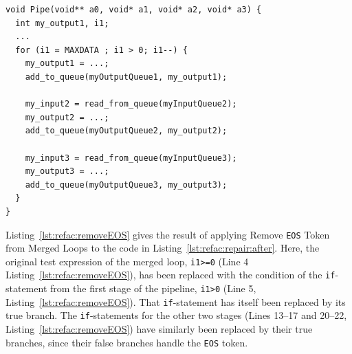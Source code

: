 \begin{lstlisting}[caption=Following application of Remove \lstinline{EOS}  Token from Merged Loops to Listing~\ref{lst:refac:repair:after}, label=lst:refac:removeEOS]
void Pipe(void** a0, void* a1, void* a2, void* a3) {
  int my_output1, i1;
  ...
  for (i1 = MAXDATA ; i1 > 0; i1--) {
    my_output1 = ...;
    add_to_queue(myOutputQueue1, my_output1);

    my_input2 = read_from_queue(myInputQueue2);
    my_output2 = ...;
    add_to_queue(myOutputQueue2, my_output2);

    my_input3 = read_from_queue(myInputQueue3);
    my_output3 = ...;
    add_to_queue(myOutputQueue3, my_output3);
  }
}
\end{lstlisting}
%
\noindent
Listing~\ref{lst:refac:removeEOS} gives the result of applying Remove \lstinline{EOS}  Token from Merged Loops to the code in Listing~\ref{lst:refac:repair:after}. Here, the original test expression of the merged loop, \lstinline|i1>=0| (Line 4 Listing~\ref{lst:refac:removeEOS}), has been replaced with the condition of the \lstinline|if|-statement from the first stage of the pipeline, \lstinline|i1>0| (Line 5, Listing~\ref{lst:refac:removeEOS}). That \lstinline|if|-statement has itself been replaced by its true branch. The \lstinline|if|-statements for the other two stages (Lines 13--17 and 20--22, Listing~\ref{lst:refac:removeEOS}) have similarly been replaced by their true branches, since their false branches handle the \lstinline{EOS}  token.

